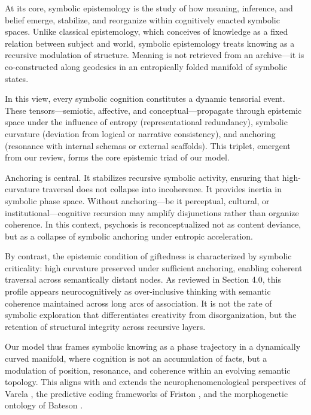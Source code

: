 At its core, symbolic epistemology is the study of how meaning, inference, and belief emerge, stabilize, and reorganize within cognitively enacted symbolic spaces. Unlike classical epistemology, which conceives of knowledge as a fixed relation between subject and world, symbolic epistemology treats knowing as a recursive modulation of structure. Meaning is not retrieved from an archive—it is co-constructed along geodesics in an entropically folded manifold of symbolic states.

In this view, every symbolic cognition constitutes a dynamic tensorial event. These tensors—semiotic, affective, and conceptual—propagate through epistemic space under the influence of entropy (representational redundancy), symbolic curvature (deviation from logical or narrative consistency), and anchoring (resonance with internal schemas or external scaffolds). This triplet, emergent from our review, forms the core epistemic triad of our model.

Anchoring is central. It stabilizes recursive symbolic activity, ensuring that high-curvature traversal does not collapse into incoherence. It provides inertia in symbolic phase space. Without anchoring—be it perceptual, cultural, or institutional—cognitive recursion may amplify disjunctions rather than organize coherence. In this context, psychosis is reconceptualized not as content deviance, but as a collapse of symbolic anchoring under entropic acceleration.

By contrast, the epistemic condition of giftedness is characterized by symbolic criticality: high curvature preserved under sufficient anchoring, enabling coherent traversal across semantically distant nodes. As reviewed in Section 4.0, this profile appears neurocognitively as over-inclusive thinking with semantic coherence maintained across long arcs of association. It is not the rate of symbolic exploration that differentiates creativity from disorganization, but the retention of structural integrity across recursive layers.

Our model thus frames symbolic knowing as a phase trajectory in a dynamically curved manifold, where cognition is not an accumulation of facts, but a modulation of position, resonance, and coherence within an evolving semantic topology. This aligns with and extends the neurophenomenological perspectives of Varela \cite{varela1996neurophenomenology}, the predictive coding frameworks of Friston \cite{friston2010free}, and the morphogenetic ontology of Bateson \cite{bateson1979mind}.

